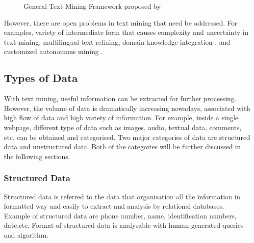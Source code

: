 \documentclass[twoside]{utmthesis}
\begin{document}
\begin{figure}[h]
\centering
{}
\caption{General Text Mining Framework proposed by \cite{tan1999text}}
\end{figure}

However, there are open problems in text mining that need be addressed. For examples, variety of intermediate form that causes complexity and uncertainty in text mining, multilingual text refining, domain knowledge integration \citep{lima2009domain}, and customized autonomous mining \citep{afzal2010rule}.

\pagebreak
\subsection{Types of Data}
With text mining, useful information can be extracted for further processing. However, the volume of data is dramatically increasing nowadays, associated with high flow of data and high variety of information. For example, inside a single webpage, different type of data such as images, audio, textual data, comments, etc. can be obtained and categorised. Two major categories of data are structured data and unstructured data. Both of the categories will be further discussed in the following sections. 

\subsubsection{Structured Data}
Structured data is referred to the data that organisation all the information in formatted way and easily to extract and analysis by relational databases\citep{christinetaylor2018}. Example of structured data are phone number, name, identification numbers, date,etc. Format of structured data is analysable with human-generated queries and algorithm.  
\end{document}
